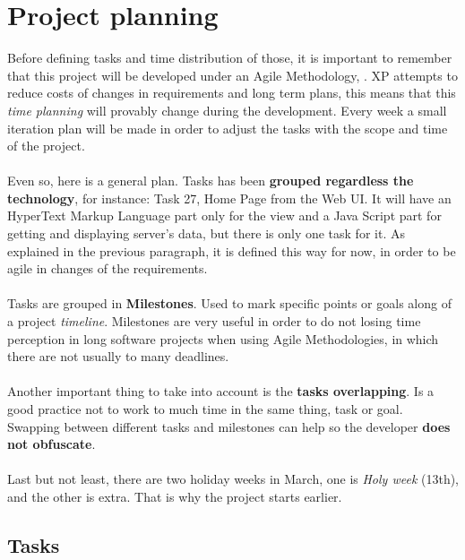 
\chapter{Project planning}

\label{chapter05}

Before defining tasks and time distribution of those, it is important to remember that this project will be developed under an Agile Methodology, . XP attempts to reduce costs of changes in requirements and long term plans, this means that this \textit{time planning} will provably change during the development. Every week a small iteration plan will be made in order to adjust the tasks with the scope and time of the project.
\\\\
Even so, here is a general plan. Tasks has been \textbf{grouped regardless the technology}, for instance\cite{w3_templates}: Task 27, Home Page from the Web UI. It will have an HyperText Markup Language part only for the view and a Java Script part for getting and displaying server's data, but there is only one task for it. As explained in the previous paragraph, it is defined this way for now, in order to be agile in changes of the requirements.
\\\\
Tasks are grouped in \textbf{Milestones}. Used to mark specific points or goals along of a project \textit{timeline}. Milestones are very useful in order to do not losing time perception in long software projects when using Agile Methodologies, in which there are not usually to many deadlines.
\\\\
Another important thing to take into account is the \textbf{tasks overlapping}. Is a good practice\cite{clean_coder} not to work to much time in the same thing, task or goal. Swapping between different tasks and milestones can help so the developer \textbf{does not obfuscate}.
\\\\
Last but not least, there are two holiday weeks in March, one is \textit{Holy week} (13th), and the other is extra. That is why the project starts earlier.


\section{Tasks}

